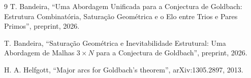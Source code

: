 \documentclass[12pt, a4paper]{article}
\begin{document}
	\begin{thebibliography}{9}
		T. Bandeira, ``Uma Abordagem Unificada para a Conjectura de Goldbach: Estrutura Combinatória, Saturação Geométrica e o Elo entre Trios e Pares Primos'', preprint, 2026.
		
		T. Bandeira, ``Saturação Geométrica e Inevitabilidade Estrutural: Uma Abordagem de Malhas $3\times N$ para a Conjectura de Goldbach'', preprint, 2026.
		
		H. A. Helfgott, ``Major arcs for Goldbach's theorem'', arXiv:1305.2897, 2013.
	\end{thebibliography}
	
\end{document}
